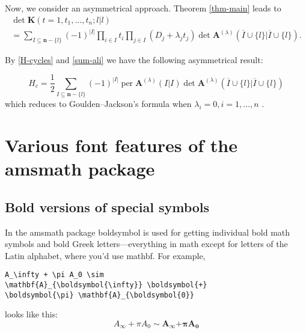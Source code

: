 \documentclass[mlq,fleqn]{w-art}
\newcommand{\ntt}{\normalfont\ttfamily}
\newcommand{\cn}[1]{{\protect\ntt\bslash#1}}
\newcommand{\pkg}[1]{{\protect\ntt#1}}
\DeclareMathOperator{\per}{per}
\newcommand{\envert}[1]{\left\lvert#1\right\rvert}
\let\abs=\envert
\begin{document}
Now, we consider an asymmetrical approach. Theorem \ref{thm-main} leads to
\begin{multline}
\det\mathbf{K}(t=1,t_1,\dots,t_n;l |l )\\
=\sum_{I\subseteq\mathbf{n}-\{l \}}
(-1)^{\abs{I}}\prod_{i\in I}t_i\prod_{j\in I}
(D_j+\lambda_jt_j)\det\mathbf{A}^{(\lambda)}
(\overline I\cup\{l \}|\overline I\cup\{l \}).
\end{multline}

By \eqref{H-cycles} and \eqref{sum-ali} we have the following asymmetrical
result:
\begin{thm}\label{thm-asym}
\begin{equation}
H_c=\frac12\sum_{I\subseteq\mathbf{n}-\{l \}}
(-1)^{\abs{I}}\per\mathbf{A}^{(\lambda)}(I|I)\det
\mathbf{A}^{(\lambda)}
(\overline I\cup\{l \}|\overline I\cup\{l \})
\end{equation}
which reduces to Goulden--Jackson's formula when $\lambda_i=0,i=1,\dots,n$
\cite{mami:matrixth}.
\end{thm}

\section{Various font features of the \pkg{amsmath} package}
\label{s:font}
\subsection{Bold versions of special symbols}

In the \pkg{amsmath} package \cn{boldsymbol} is used for getting
individual bold math symbols and bold Greek letters---everything in
math except for letters of the Latin alphabet,
where you'd use \cn{mathbf}.  For example,
\begin{verbatim}
A_\infty + \pi A_0 \sim
\mathbf{A}_{\boldsymbol{\infty}} \boldsymbol{+}
\boldsymbol{\pi} \mathbf{A}_{\boldsymbol{0}}
\end{verbatim}
looks like this:
\[A_\infty + \pi A_0 \sim \mathbf{A}_{\boldsymbol{\infty}}
\boldsymbol{+} \boldsymbol{\pi} \mathbf{A}_{\boldsymbol{0}}\]
\end{document}
